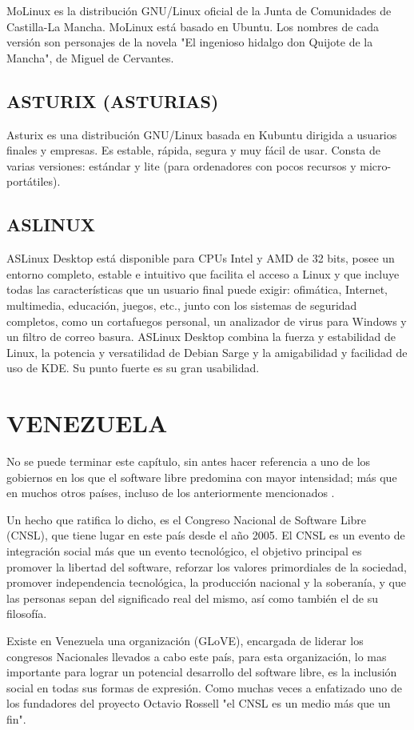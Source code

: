 MoLinux es la distribución GNU/Linux oficial de la Junta de Comunidades de Castilla-La Mancha. MoLinux está basado en Ubuntu. Los nombres de cada versión son personajes de la 
novela "El ingenioso hidalgo don Quijote de la Mancha", de Miguel de Cervantes.

\subsection*{ASTURIX (ASTURIAS)}
Asturix es una distribución GNU/Linux basada en Kubuntu dirigida a usuarios finales y empresas. Es estable, rápida, segura y muy fácil de usar. Consta de varias versiones: 
estándar y lite (para ordenadores con pocos recursos y micro-portátiles).

\subsection*{ASLINUX}
ASLinux Desktop está disponible para CPUs Intel y AMD de 32 bits, posee un entorno completo, estable e intuitivo que facilita el acceso a Linux y que incluye todas las 
características que un usuario final puede exigir: ofimática, Internet, multimedia, educación, juegos, etc., junto con los sistemas de seguridad completos, como un cortafuegos 
personal, un analizador de virus para Windows y un filtro de correo basura. ASLinux Desktop combina la fuerza y estabilidad de Linux, la potencia y versatilidad de Debian Sarge y 
la amigabilidad y facilidad de uso de KDE. Su punto fuerte es su gran usabilidad.


\section*{VENEZUELA}
No se puede terminar este capítulo, sin antes hacer referencia a uno de los gobiernos en los que el software libre predomina con mayor intensidad; más que en muchos otros países, 
incluso de los anteriormente mencionados .

Un hecho que ratifica lo dicho, es el Congreso Nacional de Software Libre (CNSL), que tiene lugar en este país desde el año 2005. El CNSL es un evento de integración social más 
que un evento tecnológico, el objetivo principal es promover la libertad del software, reforzar los valores primordiales de la sociedad, promover independencia tecnológica, la 
producción nacional y la soberanía, y que las personas sepan del significado real del mismo, así como también el de su filosofía. 

Existe en Venezuela una organización (GLoVE), encargada de liderar los congresos Nacionales llevados a cabo este país, para esta organización, lo mas importante para lograr un 
potencial desarrollo del software libre, es la inclusión social en todas sus formas de expresión. Como muchas veces a enfatizado uno de los fundadores del proyecto Octavio 
Rossell "el CNSL es un medio más que un fin".

